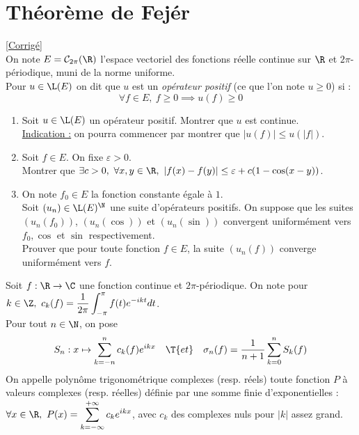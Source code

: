 \documentclass{book}
\begin{document}
	\section{Théorème de Fejér }
	\textcolor{blue}{\hyperref[Théorème de Fejér corrigé]{[Corrigé]}}\\
	\label{Théorème de Fejér}
	On note $E=\mathcal C_{2\pi}(\R)$ l'espace vectoriel des fonctions réelle continue sur $\R$ et $2\pi$-périodique, muni de la norme uniforme.\\
	Pour $u\in \L(E)$ on dit que $u$ est un \textit{opérateur positif} (ce que l'on note $u\geq 0$) si :
	$$\forall f\in E,\ f\geq 0\implies u(f)\geq 0$$
	\begin{enumerate}
		\item Soit $u\in \L(E)$ un opérateur positif. Montrer que $u$ est continue.\\
		\underline{Indication :} on pourra commencer par montrer que $|u(f)|\leq u(|f|)$.
		\item Soit $f\in E$. On fixe $\varepsilon>0$.\\
		Montrer que $\exists c>0,\ \forall x,y\in \R,\ |f(x)-f(y)|\leq \varepsilon+c(1-\cos(x-y))$.
		\item On note $f_0\in E$ la fonction constante égale à $1$.\\
		Soit $(u_n)\in \L(E)^\N$ une suite d'opérateurs positifs. On suppose que les suites $(u_n(f_0))$, $(u_n(\cos))$ et $(u_n(\sin))$ convergent uniformément vers $f_0,\cos$ et $\sin$ respectivement.\\
		Prouver que pour toute fonction $f\in E$, la suite $(u_n(f))$ converge uniformément vers $f$.
	\end{enumerate}
	
	Soit $f:\R\to \C$ une fonction continue et $2\pi$-périodique. On note pour $k\in \Z,\ c_k(f)=\displaystyle\frac{1}{2\pi}\int_{-\pi}^{\pi}f(t)e^{-ikt}dt$.\\
	Pour tout $n\in \N$, on pose
	$$S_n:x\mapsto \sum_{k=-n}^nc_k(f)e^{ikx}\quad\T{et}\quad\sigma_n(f)=\frac{1}{n+1}\sum_{k=0}^nS_k(f)$$
	On appelle polynôme trigonométrique complexes (resp. réels) toute fonction $P$ à valeurs complexes (resp. réelles) définie par une somme finie d'exponentielles :\\
	$\forall x\in \R,\ P(x)=\displaystyle\sum_{k=-\infty}^{+\infty}c_ke^{ikx}$, avec $c_k$ des complexes nuls pour $|k|$ assez grand.
	
\end{document}
